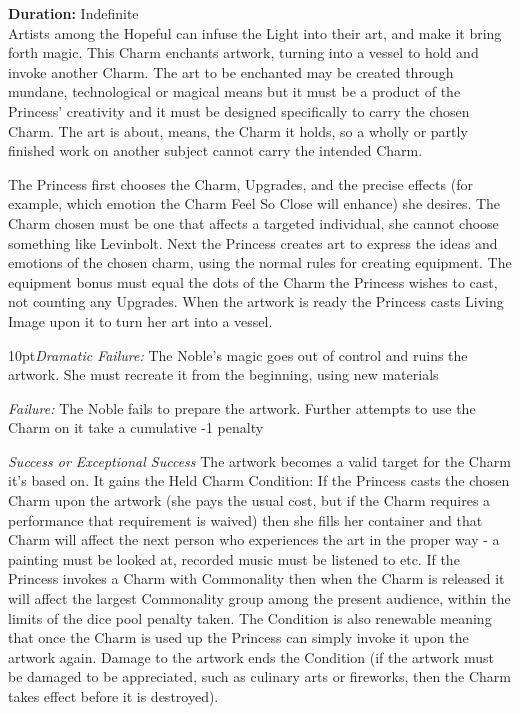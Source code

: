\noindent \textbf{Duration:} Indefinite\\

\noindent Artists among the Hopeful can infuse the Light into their art, and make it bring forth magic. This Charm enchants artwork, turning into a vessel to hold and invoke another Charm. The art to be enchanted may be created through mundane, technological or magical means but it must be a product of the Princess' creativity and it must be designed specifically to carry the chosen Charm. The art is about, means, the Charm it holds, so a wholly or partly finished work on another subject cannot carry the intended Charm.

The Princess first chooses the Charm, Upgrades, and  the precise effects (for example, which emotion the Charm Feel So Close will enhance) she desires. The Charm chosen must be one that affects a targeted individual, she cannot choose something like Levinbolt. Next the Princess creates art to express the ideas and emotions of the chosen charm, using the normal rules for creating equipment. The equipment bonus must equal the dots of the Charm the Princess wishes to cast, not counting any Upgrades. When the artwork is ready the Princess casts Living Image upon it to turn her art into a vessel. 


\begin{myindentpar}{10pt}\emph{Dramatic Failure:} The Noble’s magic goes out of control and ruins the artwork. She must recreate it from the beginning, using new materials
 
 \emph{Failure:} The Noble fails to prepare the artwork. Further attempts to use the Charm on it take a cumulative -1 penalty
 
 \emph{Success or Exceptional Success} The artwork becomes a valid target for the Charm it’s based on. It gains the Held Charm Condition: If the Princess casts the chosen Charm upon the artwork (she pays the usual cost, but if the Charm requires a performance that requirement is waived) then she fills her container and that Charm will affect the next person who experiences the art in the proper way - a painting must be looked at, recorded music must be listened to etc. If the Princess invokes a Charm with Commonality then when the Charm is released it will affect the largest Commonality group among the present audience, within the limits of the dice pool penalty taken. The Condition is also renewable meaning that once the Charm is used up the Princess can simply invoke it upon the artwork again. Damage to the artwork ends the Condition (if the artwork must be damaged to be appreciated, such as culinary arts or fireworks, then the Charm takes effect 
before it is destroyed). 
 
\end{myindentpar}

